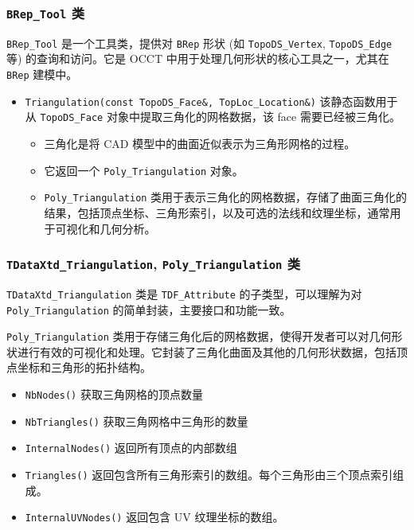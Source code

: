 \documentclass[11pt]{article}
\begin{document}
\subsubsection{\texttt{BRep\_Tool} 类}
\label{sec:org90810a4}

\texttt{BRep\_Tool} 是一个工具类，提供对 \texttt{BRep} 形状 (如 \texttt{TopoDS\_Vertex}, \texttt{TopoDS\_Edge} 等) 的查询和访问。它是 OCCT 中用于处理几何形状的核心工具之一，尤其在 \texttt{BRep} 建模中。

\begin{itemize}
\item \texttt{Triangulation(const TopoDS\_Face\&, TopLoc\_Location\&)} 该静态函数用于从 \texttt{TopoDS\_Face} 对象中提取三角化的网格数据，该 face 需要已经被三角化。
\begin{itemize}
\item 三角化是将 CAD 模型中的曲面近似表示为三角形网格的过程。
\item 它返回一个 \texttt{Poly\_Triangulation} 对象。
\item \texttt{Poly\_Triangulation} 类用于表示三角化的网格数据，存储了曲面三角化的结果，包括顶点坐标、三角形索引，以及可选的法线和纹理坐标，通常用于可视化和几何分析。
\end{itemize}
\end{itemize}
\subsubsection{\texttt{TDataXtd\_Triangulation}, \texttt{Poly\_Triangulation} 类}
\label{sec:org52aaaef}

\texttt{TDataXtd\_Triangulation} 类是 \texttt{TDF\_Attribute} 的子类型，可以理解为对 \texttt{Poly\_Triangulation} 的简单封装，主要接口和功能一致。

\texttt{Poly\_Triangulation} 类用于存储三角化后的网格数据，使得开发者可以对几何形状进行有效的可视化和处理。它封装了三角化曲面及其他的几何形状数据，包括顶点坐标和三角形的拓扑结构。

\begin{itemize}
\item \texttt{NbNodes()} 获取三角网格的顶点数量
\item \texttt{NbTriangles()} 获取三角网格中三角形的数量
\item \texttt{InternalNodes()} 返回所有顶点的内部数组
\item \texttt{Triangles()} 返回包含所有三角形索引的数组。每个三角形由三个顶点索引组成。
\item \texttt{InternalUVNodes()} 返回包含 UV 纹理坐标的数组。
\end{itemize}
\end{document}
